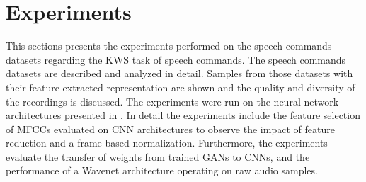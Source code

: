 
\chapter{Experiments}\label{sec:exp}
This sections presents the experiments performed on the speech commands datasets regarding the KWS task of speech commands.
The speech commands datasets are described and analyzed in detail.
Samples from those datasets with their feature extracted representation are shown and the quality and diversity of the recordings is discussed.
The experiments were run on the neural network architectures presented in .
In detail the experiments include the feature selection of MFCCs evaluated on CNN architectures to observe the impact of feature reduction and a frame-based normalization.
Furthermore, the experiments evaluate the transfer of weights from trained GANs to CNNs, and the performance of a Wavenet architecture operating on raw audio samples.








